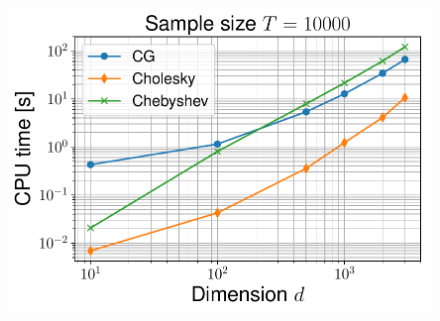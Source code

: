 \documentclass[aspectratio=169]{beamer}
\begin{document}
\begin{frame}
\begin{figure}
    \mbox{{\includegraphics[scale=0.33]{src/images/simu1_ex1_time_10000.pdf}}}
  \end{figure}
\end{frame}
\end{document}
